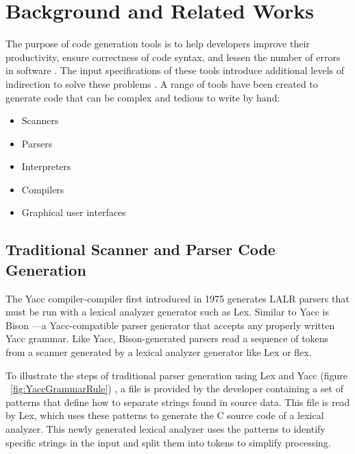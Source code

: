 \chapter{Background and Related Works}
The purpose of code generation tools is to help developers improve their productivity, ensure correctness of code syntax, and lessen the number of errors in software \cite{groher_01}.  The input specifications of these tools introduce additional levels of indirection to solve these problems \cite{spinellis_01}.  A range of tools have been created to generate code that can be complex and tedious to write by hand:
\begin{itemize}
  \item Scanners
  \item Parsers
  \item Interpreters
  \item Compilers
  \item Graphical user interfaces
\end{itemize}

\section{Traditional Scanner and Parser Code Generation}
The Yacc compiler-compiler \cite{johnson_01} first introduced in 1975 generates LALR parsers that must be run with a lexical analyzer generator such as Lex.  Similar to Yacc is Bison \cite{aycock_01,demaille_01}—a Yacc-compatible parser generator that accepts any properly written Yacc grammar.  Like Yacc, Bison-generated parsers read a sequence of tokens from a scanner generated by a lexical analyzer generator like Lex or flex.

\indent
To illustrate the steps of traditional parser generation using Lex and Yacc (figure ~\ref{fig:YaccGrammarRule}) \cite{johnson_01,lesk_01,niemann_01}, a file is provided by the developer containing a set of patterns that define how to separate strings found in source data.  This file is read by Lex, which uses these patterns to generate the C source code of a lexical analyzer.  This newly generated lexical analyzer uses the patterns to identify specific strings in the input and split them into tokens to simplify processing.

